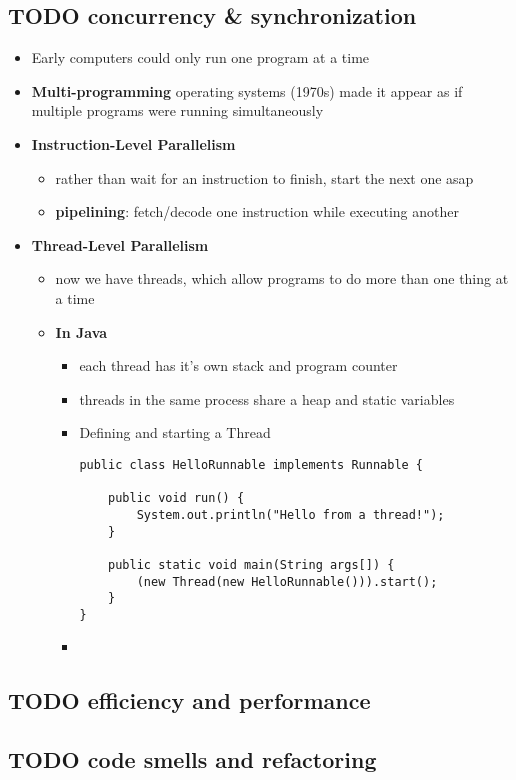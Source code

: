 \documentclass[11pt]{article}
\begin{document}
\subsection{{\bfseries\sffamily TODO} concurrency \& synchronization}
\label{sec-3-5}
\begin{itemize}
\item Early computers could only run one program at a time
\item \textbf{Multi-programming} operating systems (1970s) made it appear as if multiple programs were running simultaneously
\item \textbf{Instruction-Level Parallelism}
\begin{itemize}
\item rather than wait for an instruction to finish, start the next one asap
\item \textbf{pipelining}: fetch/decode one instruction while executing another
\end{itemize}
\item \textbf{Thread-Level Parallelism}
\begin{itemize}
\item now we have threads, which allow programs to do more than one thing at a time
\item \textbf{In Java}
\begin{itemize}
\item each thread has it's own stack and program counter
\item threads in the same process share a heap and static variables
\item Defining and starting a Thread
\begin{verbatim}
public class HelloRunnable implements Runnable {

    public void run() {
        System.out.println("Hello from a thread!");
    }

    public static void main(String args[]) {
        (new Thread(new HelloRunnable())).start();
    }
}
\end{verbatim}
\item 
\end{itemize}
\end{itemize}
\end{itemize}
\subsection{{\bfseries\sffamily TODO} efficiency and performance}
\label{sec-3-6}
\subsection{{\bfseries\sffamily TODO} code smells and refactoring}
\label{sec-3-7}
\end{document}
